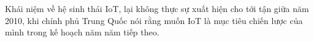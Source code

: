 

Khái niệm về hệ sinh thái IoT, lại không thực sự xuất hiện cho tới tận giữa năm 2010, khi chính phủ Trung Quốc nói rằng muốn IoT là mục tiêu chiến lược của mình trong kế hoạch năm năm tiếp theo.


